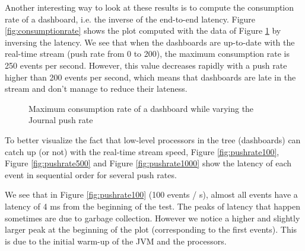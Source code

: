 Another interesting way to look at these results is to compute the consumption rate of a dashboard, i.e. the inverse of the end-to-end latency. Figure \ref{fig:consumptionrate} shows the plot computed with the data of Figure \ref{fig:latencyplot} by inversing the latency. We see that when the dashboards are up-to-date with the real-time stream (push rate from 0 to 200), the maximum consumption rate is 250 events per second. However, this value decreases rapidly with a push rate higher than 200 events per second, which means that dashboards are late in the stream and don't manage to reduce their lateness.
\\

\begin{figure}
  \begin{center} 
    \caption{Maximum consumption rate of a dashboard while varying the Journal push rate}
    \label{fig:latencyplot}
  \end{center}
\end{figure}


To better visualize the fact that low-level processors in the tree (dashboards) can catch up (or not) with the real-time stream speed, Figure \ref{fig:pushrate100}, Figure \ref{fig:pushrate500} and Figure \ref{fig:pushrate1000} show the latency of each event in sequential order for several push rates. 

We see that in Figure \ref{fig:pushrate100} (100 events / s), almost all events have a latency of 4 ms from the beginning of the test. The peaks of latency that happen sometimes are due to garbage collection. However we notice a higher and slightly larger peak at the beginning of the plot (corresponding to the first events). This is due to the initial warm-up of the JVM and the processors.

